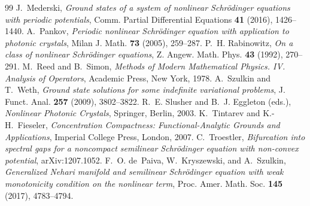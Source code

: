 \documentclass[10pt,a4paper]{amsart}
\numberwithin{equation}{section}
\begin{document}
\begin{thebibliography}{99}
 J.~Mederski, \emph{Ground states of a system of nonlinear Schrödinger equations with periodic potentials}, Comm. Partial Differential Equations \textbf{41} (2016), 1426--1440.
 A.~Pankov, \emph{Periodic nonlinear Schrödinger equation with application to photonic crystals}, Milan J. Math. \textbf{73} (2005), 259--287.
 P.~H. Rabinowitz, \emph{On a class of nonlinear Schrödinger equations}, Z. Angew. Math. Phys. \textbf{43} (1992), 270--291.
 M.~Reed and B.~Simon, \emph{Methods of Modern Mathematical Physics. IV. Analysis of Operators}, Academic Press, New York, 1978.
 A.~Szulkin and T.~Weth, \emph{Ground state solutions for some indefinite variational problems}, J. Funct. Anal. \textbf{257} (2009), 3802--3822.
 R.~E. Slusher and B.~J. Eggleton (eds.), \emph{Nonlinear Photonic Crystals}, Springer, Berlin, 2003.
 K.~Tintarev and K.-H.~Fieseler, \emph{Concentration Compactness: Functional-Analytic Grounds and Applications}, Imperial College Press, London, 2007.
 C.~Troestler, \emph{Bifurcation into spectral gaps for a noncompact semilinear Schrödinger equation with non-convex potential}, arXiv:1207.1052.
 F.~O. de~Paiva, W.~Kryszewski, and A.~Szulkin, \emph{Generalized Nehari manifold and semilinear Schrödinger equation with weak monotonicity condition on the nonlinear term}, Proc. Amer. Math. Soc. \textbf{145} (2017), 4783--4794.
\end{thebibliography}
\end{document}
